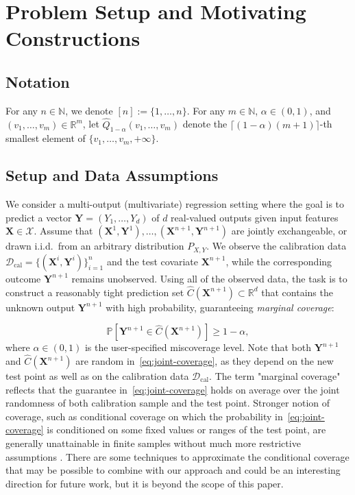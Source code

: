 \section{Problem Setup and Motivating Constructions}
\label{sec:preliminaries}

\subsection{Notation}

For any $n \in \mathbb{N}$, we denote $[n] := \{1,\ldots,n\}$.
For any $m\in\mathbb{N}$, $\alpha\in(0,1)$, and
$(v_1,\ldots,v_m)\in\mathbb{R}^m$, let
$\widehat Q_{1-\alpha}(v_1,\ldots,v_m)$
denote the $\lceil(1-\alpha)(m+1)\rceil$-th smallest element of
$\{v_1,\ldots,v_m,+\infty\}$.

\subsection{Setup and Data Assumptions}

{\color{blue}We consider a multi-output (multivariate) regression setting where the
goal is to predict a vector
$\mathbf{Y}=(Y_1,\ldots,Y_d)$ of $d$ real-valued outputs given input
features $\mathbf{X}\in\mathcal{X}$.
Assume that
$(\mathbf{X}^1,\mathbf{Y}^1),\ldots,(\mathbf{X}^{n+1},\mathbf{Y}^{n+1})$ are jointly exchangeable, or drawn
i.i.d.\ from an arbitrary distribution $P_{X,Y}$. We observe the
calibration data $\mathcal D_{\mathrm{cal}}=\{(\mathbf{X}^i,\mathbf{Y}^i)\}_{i=1}^n$
and the test covariate $\mathbf{X}^{n+1}$, while the corresponding outcome
$\mathbf{Y}^{n+1}$ remains unobserved.
Using all of the observed data, the task is to construct a reasonably tight prediction set $\hat{C}(\mathbf{X}^{n+1}) \subset \mathbb{R}^d$ that contains the unknown output $\mathbf{Y}^{n+1}$ with high probability, guaranteeing \emph{marginal coverage}:
}

\begin{equation}
\mathbb{P}\!\left[ \mathbf{Y}^{n+1} \in \hat{C}(\mathbf{X}^{n+1}) \right] \ge 1 - \alpha,
\label{eq:joint-coverage}
\end{equation}
where $\alpha \in (0,1)$ is the user-specified miscoverage level.  
Note that both $\mathbf{Y}^{n+1}$ and $\hat{C}(\mathbf{X}^{n+1})$ are random in~\eqref{eq:joint-coverage}, as they depend on the new test point as well as on the calibration data $\mathcal{D}_{\mathrm{cal}}$.  
The term "marginal coverage" reflects that the guarantee in~\eqref{eq:joint-coverage} holds on average over the joint randomness of both calibration sample and the test point. Stronger notion of coverage, such as conditional coverage on which the probability in~\eqref{eq:joint-coverage} is conditioned on some fixed values or ranges of the test point, are generally unattainable in finite samples without much more restrictive assumptions \citep{foygel2021limits}. There are some techniques to approximate the conditional coverage \citep{Romano2020With,gibbs2025conformal} that may be possible to combine with our approach and could be an interesting direction for future work, but it is beyond the scope of this paper.


